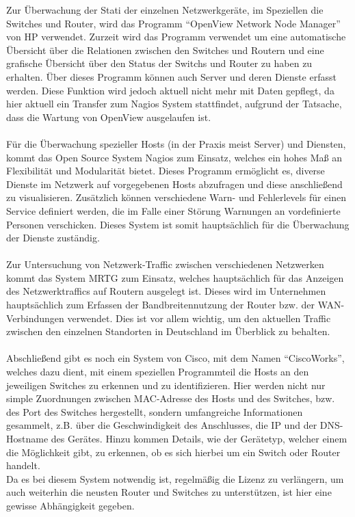Zur Überwachung der Stati der einzelnen Netzwerkgeräte, im Speziellen die Switches und Router, wird das Programm “OpenView Network Node Manager” von HP verwendet.
Zurzeit wird das Programm verwendet um eine automatische Übersicht über die Relationen zwischen den Switches und Routern und eine grafische Übersicht über den Status der Switchs und Router zu haben zu erhalten.
Über dieses Programm können auch Server und deren Dienste erfasst werden.
Diese Funktion wird jedoch aktuell nicht mehr mit Daten gepflegt, da hier aktuell ein Transfer zum Nagios System stattfindet, aufgrund der Tatsache, dass die Wartung von OpenView ausgelaufen ist.\\\\
Für die Überwachung spezieller Hosts (in der Praxis meist Server) und Diensten, kommt das Open Source System Nagios zum Einsatz, welches ein hohes Maß an Flexibilität und Modularität bietet.
Dieses Programm ermöglicht es, diverse Dienste im Netzwerk auf vorgegebenen Hosts abzufragen und diese anschließend zu visualisieren.
Zusätzlich können verschiedene Warn- und Fehlerlevels für einen Service definiert werden, die im Falle einer Störung Warnungen an vordefinierte Personen verschicken.
Dieses System ist somit hauptsächlich für die Überwachung der Dienste zuständig.\\\\
Zur Untersuchung von Netzwerk-Traffic zwischen verschiedenen Netzwerken kommt das System MRTG zum Einsatz, welches hauptsächlich für das Anzeigen des Netzwerktraffics auf Routern ausgelegt ist.
Dieses wird im Unternehmen hauptsächlich zum Erfassen der Bandbreitennutzung der Router bzw. der WAN-Verbindungen verwendet.
Dies ist vor allem wichtig, um den aktuellen Traffic zwischen den einzelnen Standorten in Deutschland im Überblick zu behalten.\\\\
Abschließend gibt es noch ein System von Cisco, mit dem Namen “CiscoWorks”, welches dazu dient, mit einem speziellen Programmteil die Hosts an den jeweiligen Switches zu erkennen und zu identifizieren.
Hier werden nicht nur simple Zuordnungen zwischen MAC-Adresse des Hosts und des Switches, bzw. des Port des Switches hergestellt,
sondern umfangreiche Informationen gesammelt, z.B. über die Geschwindigkeit des Anschlusses, die IP und der DNS-Hostname des Gerätes.
Hinzu kommen Details, wie der Gerätetyp, welcher einem die Möglichkeit gibt, zu erkennen, ob es sich hierbei um ein Switch oder Router handelt.\\
Da es bei diesem System notwendig ist, regelmäßig die Lizenz zu verlängern, um auch weiterhin die neusten Router und Switches zu unterstützen, ist hier eine gewisse Abhängigkeit gegeben.

